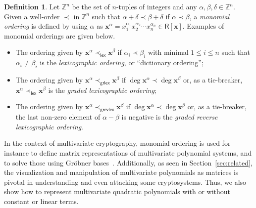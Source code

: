 \documentclass[draft, 12pt, a4paper, oneside]{memoir}
\theoremstyle{definition}
\newtheorem{definition}[theorem]{Definition}
\begin{document}
\begin{definition}
  Let $\mathbb{Z}^{n}$ be the set of $n$-tuples of integers and any $\alpha, \beta, \delta \in \mathbb{Z}^{n}$. Given a well-order $\prec$ in $\mathbb{Z}^{n}$ such that $\alpha + \delta \prec \beta + \delta$ if $\alpha \prec \beta$, a \emph{monomial ordering} is defined by using $\alpha$ as $\mathbf{x}^{\alpha} = x_{1}^{\alpha_{1}} x_{2}^{\alpha_{2}} \cdots x_{n}^{\alpha_{n}} \in \mathsf{R}[\mathbf{x}]$. Examples of monomial orderings are given below.
  
  \begin{itemize}
    \item The ordering given by $\mathbf{x}^{\alpha} \prec_{\mathsf{lex}} \mathbf{x}^{\beta}$ if $\alpha_{i} \prec \beta_{i}$ with minimal $1 \leq i \leq n$ such that $\alpha_{i} \neq \beta_{i}$ is the \emph{lexicographic ordering}, or ``dictionary ordering'';
    \item The ordering given by $\mathbf{x}^{\alpha} \prec_{\mathsf{grlex}} \mathbf{x}^{\beta}$ if $\deg \mathbf{x}^{\alpha} \prec \deg \mathbf{x}^{\beta}$ or, as a tie-breaker, $\mathbf{x}^{\alpha} \prec_{\mathsf{lex}} \mathbf{x}^{\beta}$ is the \emph{graded lexicographic ordering};
    \item The ordering given by $\mathbf{x}^{\alpha} \prec_{\mathsf{grevlex}} \mathbf{x}^{\beta}$ if $\deg \mathbf{x}^{\alpha} \prec \deg \mathbf{x}^{\beta}$ or, as a tie-breaker, the last non-zero element of $\alpha - \beta$ is negative is the \emph{graded reverse lexicographic ordering}.
  \end{itemize}
\end{definition}

In the context of multivariate cryptography, monomial ordering is used for instance to define matrix representations of multivariate polynomial systems, and to solve those using Gröbner bases~\cite[Section 21.4]{Gathen:2013}. Additionally, as seen in Section~\ref{sec:related}, the visualization and manipulation of multivariate polynomials as matrices is pivotal in understanding and even attacking some cryptosystems. Thus, we also show how to represent multivariate quadratic polynomials with or without constant or linear terms.
\end{document}

